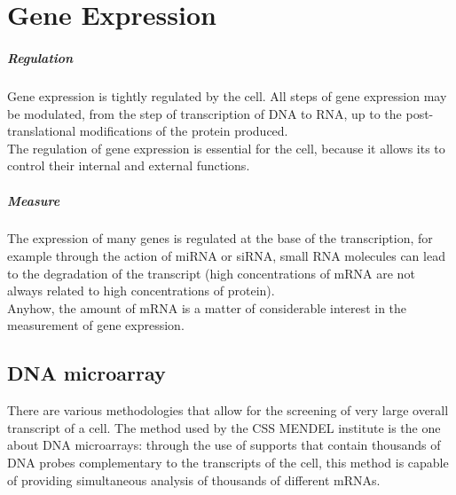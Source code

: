 \documentclass[a4paper]{report}
\begin{document}
\chapter{Gene Expression}
\paragraph{Regulation}
Gene expression is tightly regulated by the cell. All steps of gene expression may be modulated, from the step of transcription of DNA to RNA, up to the post-translational modifications of the protein produced.\\
The regulation of gene expression is essential for the cell, because it allows its to control their internal and external functions.
\paragraph{Measure}
The expression of many genes is regulated at the base of the transcription, for example through the action of miRNA or siRNA, small RNA molecules can lead to the degradation of the transcript (high concentrations of mRNA are not always related to high concentrations of protein).\\
Anyhow, the amount of mRNA is a matter of considerable interest in the measurement of gene expression.
\section{DNA microarray}
There are various methodologies that allow for the screening of very large overall transcript of a cell. The method used by the CSS MENDEL institute is the one about DNA microarrays: through the use of supports that contain thousands of DNA probes complementary to the transcripts of the cell, this method is capable of providing simultaneous analysis of thousands of different mRNAs.\\
\end{document}
